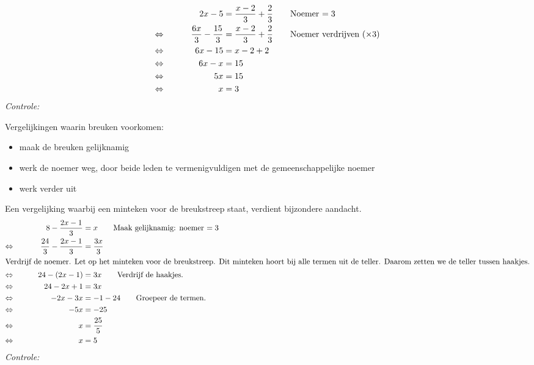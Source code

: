 \documentclass[12pt]{article}
\begin{document}
\begin{voorbeeld}
\begin{alignat*}{2}
     && 2x-5 &= \dfrac{x-2}{3} + \dfrac{2}{3} \qquad\text{Noemer $= 3$}\\
\Leftrightarrow\mkern40mu && \dfrac{6x}{3}-\dfrac{15}{3} &= \dfrac{x-2}{3} + \dfrac{2}{3} \qquad\text{Noemer verdrijven ($\times 3$)}\\
\Leftrightarrow\mkern40mu && 6x - 15	&= x - 2 + 2\\
\Leftrightarrow\mkern40mu && 6x - x	&= 15\\
\Leftrightarrow\mkern40mu && 5x	&= 15\\
\Leftrightarrow\mkern40mu && x	&= 3\\
\end{alignat*}
{\em Controle: }\\
\end{voorbeeld}

\begin{onthoud}
Vergelijkingen waarin breuken voorkomen:
\begin{itemize}
  \item maak de breuken gelijknamig
  \item werk de noemer weg, door beide leden te vermenigvuldigen met de gemeenschappelijke noemer
  \item werk verder uit
\end{itemize}
\end{onthoud}

\begin{voorbeeld}
Een vergelijking waarbij een minteken voor de breukstreep staat, verdient bijzondere aandacht.
\begin{alignat*}{2}
     && 8-\dfrac{2x-1}{3} &= x \qquad\text{Maak gelijknamig: noemer $= 3$}\\
\Leftrightarrow\mkern40mu && \dfrac{24}{3}-\dfrac{2x-1}{3} &= \dfrac{3x}{3}\\
\intertext{Verdrijf de noemer. Let op het minteken voor de breukstreep. Dit minteken hoort bij alle termen uit de teller. Daarom zetten we de teller tussen haakjes.}
\Leftrightarrow\mkern40mu && 24 - (2x - 1)	&= 3x	\qquad\text{Verdrijf de haakjes.}\\
\Leftrightarrow\mkern40mu && 24 - 2x + 1	&= 3x\\
\Leftrightarrow\mkern40mu && - 2x - 3x	&= - 1 - 24 \qquad\text{Groepeer de termen.}\\
\Leftrightarrow\mkern40mu && - 5x	&= - 25\\
\Leftrightarrow\mkern40mu && x	&= \dfrac{25}{5}\\ 
\Leftrightarrow\mkern40mu && x	&= 5\\
\end{alignat*}
{\em Controle: }\\
\end{voorbeeld}
\end{document}
